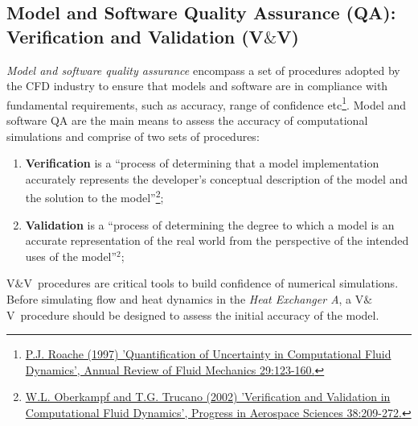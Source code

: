 \documentclass[12pts,a4paper,amsmath,amssymb,floatfix]{article}%
\newcommand{\vv}{V$\&$V}
\begin{document}
     \subsection{Model and Software Quality Assurance (QA): Verification and Validation (\vv)}
                {\it Model and software quality assurance} encompass a set of procedures adopted by the CFD industry to ensure that models and software are in compliance with fundamental requirements, such as accuracy, range of confidence etc\footnote{\href{https://doi.org/10.1146/annurev.fluid.29.1.123}{P.J. Roache (1997) 'Quantification of Uncertainty in Computational Fluid Dynamics', Annual Review of Fluid Mechanics 29:123-160.}}. Model and software QA are the main means to assess the accuracy of computational simulations and comprise of two sets of procedures:
                \begin{enumerate}
                \item {\bf Verification} is a ``process of determining that a model implementation accurately represents the developer's conceptual description of the
model and the solution to the model''\footnote{\href{https://doi.org/10.1016/S0376-0421(02)00005-2}{W.L. Oberkampf and T.G. Trucano (2002) 'Verification and Validation in Computational Fluid Dynamics', Progress in Aerospace Sciences 38:209-272.}};
                   \item {\bf Validation} is a ``process of determining the degree to which a model is an accurate representation of the real world from the perspective of the intended uses of the model''$^{2}$;
                \end{enumerate}
                \vv~procedures are critical tools to build confidence of numerical simulations. Before simulating flow and heat dynamics in the {\it Heat Exchanger A}, a \vv~procedure should be designed to assess the initial accuracy of the model.
                \medskip
\end{document}
